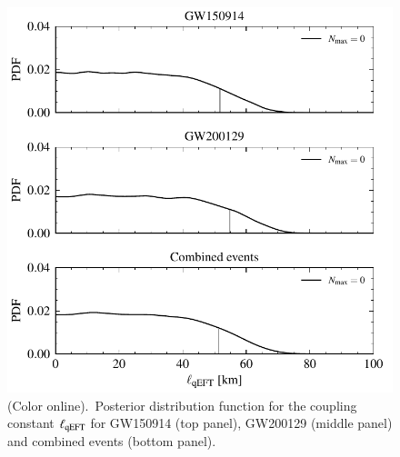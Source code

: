 \documentclass[twocolumn,
               prd,
               aps,
               superscriptaddress,
               tightenlines,
               nofootinbib,
               eqsecnum,
               amsfonts,
               amsmath,
               longbibliography]{revtex4-1}
\begin{document}
\begin{figure}[t]
\includegraphics[width=\columnwidth]{figs/qeft_posteriors_combined_corrected.pdf}
\caption{(Color online).~Posterior distribution function for the coupling constant $\ell_{\rm qEFT}$ for
GW150914 (top panel), GW200129 (middle panel) and combined events (bottom panel).
}
\label{fig:qEFT_exec_sum}
\end{figure}
\end{document}
